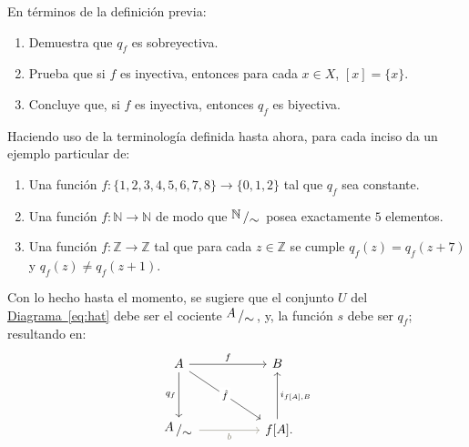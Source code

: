 \documentclass[letterpaper,DIV=14,headsepline,12pt]{scrartcl}
\newcommand{\pts}{}
\newenvironment{ejercicio}[1]{\ifthenelse{\equal{#1}{1} \OR
\equal{#1}{+1}}{\renewcommand{\pts}{\textbf{(#1
pt)}}}{\renewcommand{\pts}{\textbf{(#1 pts)}}}\begin{ejj}\upshape
\pts}{\end{ejj}}
\newcommand{\quot}[2]{{\raisebox{.2em}{$#1$}\left/\raisebox{-.2em}{$#2$}\right.}}
\begin{document}
    \begin{ejercicio}{1.5}
        En términos de la definición previa:
        \begin{enumerate}
            \item Demuestra que $q_f$ es sobreyectiva.
            \item Prueba que si $f$ es inyectiva, entonces para cada $x \in X$,
            $[x]=\{x\}$.
            \item Concluye que, si $f$ es inyectiva, entonces $q_f$ es
            biyectiva.
        \end{enumerate}
    \end{ejercicio}

    \begin{ejercicio}{1.5}
        Haciendo uso de la terminología definida hasta ahora, para cada inciso
        da un ejemplo particular de:
        \begin{enumerate}
            \item Una función $f\colon \{1,2,3,4,5,6,7,8\} \to \{0,1,2\}$ tal que
            $q_f$ sea constante.
            \item Una función $f\colon \mathbb{N} \to \mathbb{N}$ de modo que
            $\quot{\mathbb{N}}{\sim}$ posea exactamente $5$ elementos.
            \item Una función $f\colon \mathbb{Z} \to \mathbb{Z}$ tal que para cada $z
            \in \mathbb{Z}$ se cumple $q_f(z) = q_f(z+7)$ y $q_f(z) \neq q_f(z+1)$.
        \end{enumerate}
    \end{ejercicio}

    Con lo hecho hasta el momento, se sugiere que el conjunto $U$ del
    \hyperref[eq:hat]{Diagrama~\ref*{eq:hat}} debe ser el cociente
    $\quot{A}{\sim}$, y, la función $s$ debe ser $q_f$; resultando en:
    \begin{equation}\label{eq:casi}
        \begin{tikzcd}
            A && B \\
            \\
            \quot{A}{\sim} && {f[A]}\mathrlap{.}
            \arrow["f", from=1-1, to=1-3]
            \arrow["q_f"', from=1-1, to=3-1]
            \arrow["{\hat{f}}"{description}, from=1-1, to=3-3]
            \arrow["b"', from=3-1, to=3-3, draw=Cornsilk4, text=Cornsilk4]
            \arrow["{i_{f[A],B}}"', from=3-3, to=1-3]
        \end{tikzcd}
    \end{equation}
\end{document}
